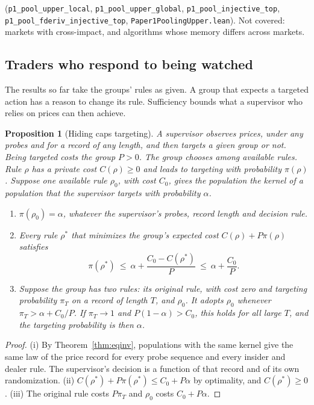 \documentclass[12pt]{article}
\newtheorem{proposition}[theorem]{Proposition}
\theoremstyle{definition}
\theoremstyle{remark}
\begin{document}
(\texttt{p1\_pool\_upper\_local}, \texttt{p1\_pool\_upper\_global}, \texttt{p1\_pool\_injective\_top}, \texttt{p1\_pool\_fderiv\_injective\_top}, \nolinkurl{Paper1PoolingUpper.lean}). Not covered: markets with cross-impact, and algorithms whose memory differs across markets.

\subsection{Traders who respond to being watched}\label{sec:hiding}

The results so far take the groups' rules as given. A group that expects a targeted action has a reason to change its rule. Sufficiency bounds what a supervisor who relies on prices can then achieve.

\begin{proposition}[Hiding caps targeting]\label{prop:hiding}
A supervisor observes prices, under any probes and for a record of any length, and then targets a given group or not. Being targeted costs the group $P>0$. The group chooses among available rules. Rule $\rho$ has a private cost $C(\rho)\ge0$ and leads to targeting with probability $\pi(\rho)$. Suppose one available rule $\rho_0$, with cost $C_0$, gives the population the kernel of a population that the supervisor targets with probability $\alpha$.
\begin{enumerate}[label=(\roman*),itemsep=1pt]
\item $\pi(\rho_0)=\alpha$, whatever the supervisor's probes, record length and decision rule.
\item Every rule $\rho^*$ that minimizes the group's expected cost $C(\rho)+P\pi(\rho)$ satisfies
\[
\pi(\rho^*)\ \le\ \alpha+\frac{C_0-C(\rho^*)}{P}\ \le\ \alpha+\frac{C_0}{P}.
\]
\item Suppose the group has two rules: its original rule, with cost zero and targeting probability $\pi_T$ on a record of length $T$, and $\rho_0$. It adopts $\rho_0$ whenever $\pi_T>\alpha+C_0/P$. If $\pi_T\to1$ and $P(1-\alpha)>C_0$, this holds for all large $T$, and the targeting probability is then $\alpha$.
\end{enumerate}
\end{proposition}

\begin{proof}
(i) By Theorem~\ref{thm:eqinv}, populations with the same kernel give the same law of the price record for every probe sequence and every insider and dealer rule. The supervisor's decision is a function of that record and of its own randomization. (ii) $C(\rho^*)+P\pi(\rho^*)\le C_0+P\alpha$ by optimality, and $C(\rho^*)\ge0$. (iii) The original rule costs $P\pi_T$ and $\rho_0$ costs $C_0+P\alpha$.
\end{proof}
\end{document}

